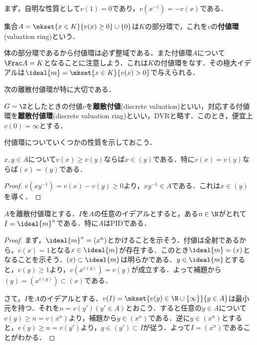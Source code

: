 まず，自明な性質として$v(1)=0$であり，$v(x^{-1})=-v(x)$である．

\begin{defi}
	集合$A=\mkset{x\in K}{v(x)\geq0}\cup\{0\}$は$K$の部分環で，これを$v$の\textbf{付値環}(valuation ring)という．
\end{defi}

体の部分環であるから付値環は必ず整域である．また付値環$A$について$\Frac A=K$となることに注意しよう．これは$K$の付値環をなす．その極大イデアルは$\ideal{m}=\mkset{x\in K}{v(x)>0}$で与えられる．

次の離散付値環が特に大切である．
\begin{defi}[離散付値]
	$G=\Z$としたときの付値$v$を\textbf{離散付値}(discrete valuation)といい，対応する付値環を\textbf{離散付値環}(discrete valuation ring)といい，DVRと略す．このとき，便宜上$v(0)=\infty$とする．
\end{defi}

付値環についていくつかの性質を示しておこう．

\begin{lem}
	$x,y\in A$について$v(x)\geq v(y)$ならば$x\in (y)$である．特に$v(x)=v(y)$ならば$(x)=(y)$である．
\end{lem}

\begin{proof}
	$v(xy^{-1})=v(x)-v(y)\geq0$より，$xy^{-1}\in A$である．これは$x\in (y)$を導く．
\end{proof}

\begin{prop}\label{prop:離散付値環の性質}
	$A$を離散付値環とする．$I$を$A$の任意のイデアルとすると，ある$n\in\N$がとれて$I=\ideal{m}^n$である．特に$A$はPIDである．
\end{prop}

\begin{proof}
	まず，$\ideal{m}^n=(x^n)$とかけることを示そう．付値は全射であるから，$v(x)=1$となる$x\in\ideal{m}$が存在する．このとき$\ideal{m}=(x)$となることを示そう．$(x)\subset\ideal{m}$は明らかである．$y\in\ideal{m}$とすると，$v(y)\geq1$より，$v(x^{v(y)})=v(y)$が成立する．よって補題から$(y)=(x^{v(y)})\subset(x)$である．
	
	さて，$I$を$A$のイデアルとする．$v(I)=\mkset{v(y)\in\N\cup\{\infty\}}{y\in A}$は最小元を持つ．それを$n=v(y') (y'\in A)$とおこう．すると任意の$y\in A$について$v(y)\geq n=v(x^n)$より，補題から$y\in (x^n)$である．逆に$y\in(x^n)$とすると，$v(y)\geq n=v(y')$より，$y\in(y')\subset I$が従う．よって$I=(x^n)$であることがわかる．
\end{proof}

